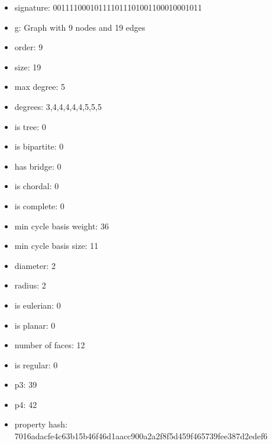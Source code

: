 \newpage
\begin{figure}
\end{figure}
\begin{itemize}
\item signature: 001111000101111011101001100010001011
\item g: Graph with 9 nodes and 19 edges
\item order: 9
\item size: 19
\item max degree: 5
\item degrees: 3,4,4,4,4,4,5,5,5
\item is tree: 0
\item is bipartite: 0
\item has bridge: 0
\item is chordal: 0
\item is complete: 0
\item min cycle basis weight: 36
\item min cycle basis size: 11
\item diameter: 2
\item radius: 2
\item is eulerian: 0
\item is planar: 0
\item number of faces: 12
\item is regular: 0
\item p3: 39
\item p4: 42
\item property hash: 7016adacfe4c63b15b46f46d1aacc900a2a2f8f5d459f465739fee387d2edef6
\end{itemize}
